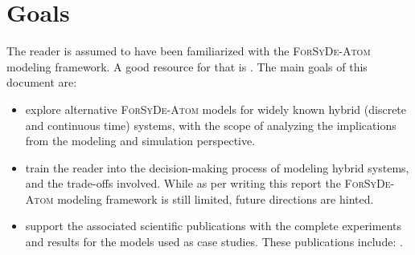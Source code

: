 
\section{Goals}
\label{sec:goals}

The reader is assumed to have been familiarized with the \textsc{ForSyDe-Atom} modeling framework. A good resource for that is . The main goals of this document are:
\begin{itemize}
\item explore alternative \textsc{ForSyDe-Atom} models for widely known hybrid (discrete and continuous time) systems, with the scope of analyzing the implications from the modeling and simulation perspective.
\item train the reader into the decision-making process of modeling hybrid systems, and the trade-offs involved. While as per writing this report the \textsc{ForSyDe-Atom} modeling framework is still limited, future directions are hinted.
\item support the associated scientific publications with the complete experiments and results for the models used as case studies. These publications include: \cite{ungureanu18a}.
\end{itemize}


